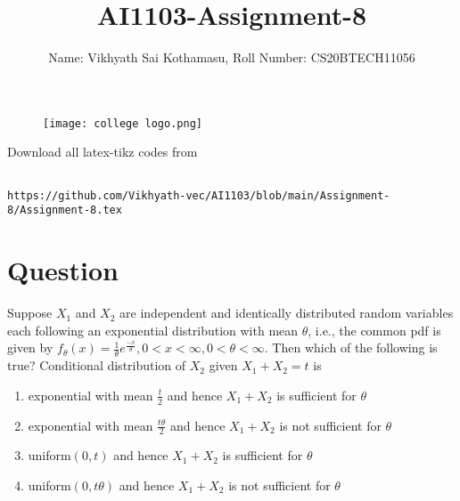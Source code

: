 \documentclass[journal,12pt,twocolumn]{IEEEtran}
\begin{document}
\title{AI1103-Assignment-8}
\author{Name: Vikhyath Sai Kothamasu, Roll Number: CS20BTECH11056}
\maketitle
\newpage
\bigskip
\renewcommand{\thefigure}{\theenumi}
\renewcommand{\thetable}{\theenumi}

\begin{figure} [h]
    \texttt{[image: college logo.png]}
\end{figure}


%
Download all latex-tikz codes from 
%
\begin{lstlisting}

https://github.com/Vikhyath-vec/AI1103/blob/main/Assignment-8/Assignment-8.tex
\end{lstlisting}
\section*{Question}
Suppose $X_1$ and $X_2$ are independent and identically distributed random variables each following an exponential distribution with mean $\theta$, i.e., the common pdf is given by $f_\theta(x) = \frac{1}{\theta}e^{\frac{-x}{\theta}}, 0<x<\infty,0<\theta<\infty.$ Then which of the following is true? Conditional distribution of $X_2$ given $X_1+X_2=t$ is 
\begin{enumerate}
    \item exponential with mean $\frac{t}{2}$ and hence $X_1+X_2$ is sufficient for $\theta$ \label{option 1}
    \item exponential with mean $\frac{t\theta}{2}$ and hence $X_1+X_2$ is not sufficient for $\theta$ \label{option 2}
    \item uniform$(0,t)$ and hence $X_1+X_2$ is sufficient for $\theta$ \label{option 3}
    \item uniform$(0,t\theta)$ and hence $X_1+X_2$ is not sufficient for $\theta$ \label{option 4}
\end{enumerate}
    
\end{document}
